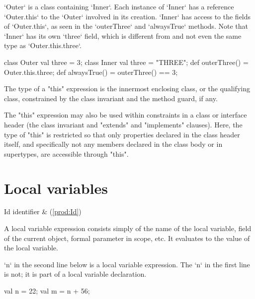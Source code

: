 \begin{ex}
\xcd`Outer` is a class containing \xcd`Inner`.  Each instance of
\xcd`Inner` has a reference \xcd`Outer.this` to the \xcd`Outer` involved in its
creation.  \xcd`Inner` has access to the fields of \xcd`Outer.this`, as seen
in the \xcd`outerThree` and \xcd`alwaysTrue` methods.  Note that \xcd`Inner`
has its own \xcd`three` field, which is different from and not even the same
type as \xcd`Outer.this.three`. 
\begin{xten}
class Outer {
  val three = 3;
  class Inner {
     val three = "THREE";
     def outerThree() = Outer.this.three;
     def alwaysTrue() = outerThree() == 3;
  }
}
\end{xten}
%
\end{ex}

The type of a \xcd"this" expression is the
innermost enclosing class, or the qualifying class,
constrained by the class invariant and the
method guard, if any.

The \xcd"this" expression may also be used within constraints in
a class or interface header (the class invariant and
\xcd"extends" and \xcd"implements" clauses).  Here, the type of
\xcd"this" is restricted so that only properties declared in the
class header itself, and specifically not any members declared in the class
body or in supertypes, are accessible through \xcd"this".

\section{Local variables}

\begin{bbgrammar}
                  Id \: identifier & (\ref{prod:Id}) \\
\end{bbgrammar}

A local variable expression consists simply of the name of the local variable,
field of the current object, formal parameter in scope, etc. It evaluates to
the value of the local variable. 


\begin{ex}
\xcd`n` in the second line below is a local
variable expression.  The \xcd`n` in the first line is not; it is part of a
local variable declaration.
\begin{xten}
val n = 22;
val m = n + 56;
\end{xten}

\end{ex}

